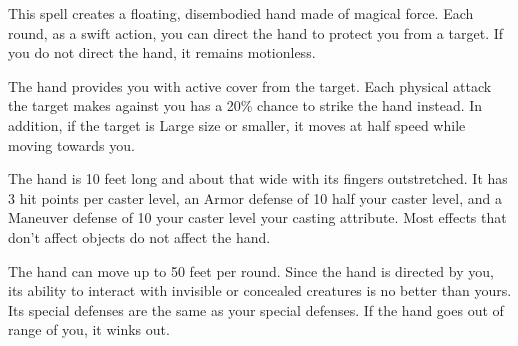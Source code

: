 \begin{spellheader}
\end{spellheader}
\begin{spellcontent}
    \begin{spelleffects}
        \spelleffect This spell creates a floating, disembodied hand made of magical force. Each round, as a swift action, you can direct the hand to protect you from a target. If you do not direct the hand, it remains motionless.

        The hand provides you with active cover from the target. Each physical attack the target makes against you has a 20\% chance to strike the hand instead. In addition, if the target is Large size or smaller, it moves at half speed while moving towards you.

        The hand is 10 feet long and about that wide with its fingers outstretched. It has 3 hit points per caster level, an Armor defense of 10 \add half your caster level, and a Maneuver defense of 10 \add your caster level \add your casting attribute. Most effects that don't affect objects do not affect the hand.
        \spelldur{\durshort \dismissable}
    \end{spelleffects}
\end{spellcontent}
\begin{spellfooter}
    \spellnotes The hand can move up to 50 feet per round. Since the hand is directed by you, its ability to interact with invisible or concealed creatures is no better than yours. Its special defenses are the same as your special defenses. If the hand goes out of range of you, it winks out.
\end{spellfooter}


